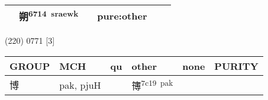 \documentclass[14pt,a4paper]{scrartcl}
\begin{document}
\begin{longtable}[c]{@{}llllll@{}}
\begin{minipage}[t]{0.14\columnwidth}\raggedright\strut
\strut\end{minipage} &
\begin{minipage}[t]{0.14\columnwidth}\raggedright\strut
朔\textsuperscript{6714~sraewk}
\strut\end{minipage} &
\begin{minipage}[t]{0.14\columnwidth}\raggedright\strut
\strut\end{minipage} &
\begin{minipage}[t]{0.14\columnwidth}\raggedright\strut
pure:other
\strut\end{minipage}\tabularnewline
\bottomrule
\end{longtable}

(220) 0771 {[}3{]}

\begin{longtable}[c]{@{}llllll@{}}
\toprule
\begin{minipage}[b]{0.14\columnwidth}\raggedright\strut
GROUP
\strut\end{minipage} &
\begin{minipage}[b]{0.14\columnwidth}\raggedright\strut
MCH
\strut\end{minipage} &
\begin{minipage}[b]{0.14\columnwidth}\raggedright\strut
qu
\strut\end{minipage} &
\begin{minipage}[b]{0.14\columnwidth}\raggedright\strut
other
\strut\end{minipage} &
\begin{minipage}[b]{0.14\columnwidth}\raggedright\strut
none
\strut\end{minipage} &
\begin{minipage}[b]{0.14\columnwidth}\raggedright\strut
PURITY
\strut\end{minipage}\tabularnewline
\midrule
\endhead
\begin{minipage}[t]{0.14\columnwidth}\raggedright\strut
博
\strut\end{minipage} &
\begin{minipage}[t]{0.14\columnwidth}\raggedright\strut
pak, pjuH
\strut\end{minipage} &
\begin{minipage}[t]{0.14\columnwidth}\raggedright\strut
\strut\end{minipage} &
\begin{minipage}[t]{0.14\columnwidth}\raggedright\strut
簙\textsuperscript{7c19~pak}
\strut\end{minipage} &

\end{longtable}
\end{document}
